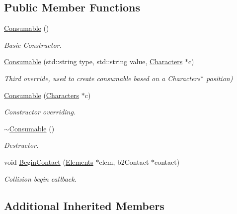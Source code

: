 \subsection*{Public Member Functions}
\begin{DoxyCompactItemize}
\item 
\hyperlink{class_consumable_ae374944f6333618dd08318b98b6950c7}{Consumable} ()
\begin{DoxyCompactList}\small\item\em Basic Constructor. \end{DoxyCompactList}\item 
\hyperlink{class_consumable_adf76e58745007421a38fb07af1c35d1a}{Consumable} (std\+::string type, std\+::string value, \hyperlink{class_characters}{Characters} $\ast$c)
\begin{DoxyCompactList}\small\item\em Third override, used to create consumable based on a Characters$\ast$ position) \end{DoxyCompactList}\item 
\hyperlink{class_consumable_adeca9f0d06a24fb2b76ddaa1396d1ddc}{Consumable} (\hyperlink{class_characters}{Characters} $\ast$c)
\begin{DoxyCompactList}\small\item\em Constructor overriding. \end{DoxyCompactList}\item 
\hypertarget{class_consumable_aed7671d58f80f5244e5851f591e4b8a2}{\hyperlink{class_consumable_aed7671d58f80f5244e5851f591e4b8a2}{$\sim$\+Consumable} ()}\label{class_consumable_aed7671d58f80f5244e5851f591e4b8a2}

\begin{DoxyCompactList}\small\item\em Destructor. \end{DoxyCompactList}\item 
void \hyperlink{class_consumable_adb866e69c3796edffad832b88e527518}{Begin\+Contact} (\hyperlink{class_elements}{Elements} $\ast$elem, b2\+Contact $\ast$contact)
\begin{DoxyCompactList}\small\item\em Collision begin callback. \end{DoxyCompactList}\end{DoxyCompactItemize}
\subsection*{Additional Inherited Members}


